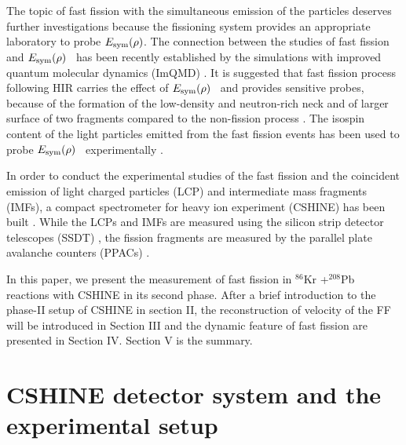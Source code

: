 \documentclass[submitting]{nst}
\def\krpb {$^{86}$Kr +$^{208}$Pb}
\def\esym{$E_{sym}(\rho)$}
\def\esym {$E_{\rm sym}(\rho)$}
\begin{document}
The topic of fast fission with the simultaneous emission of the particles deserves further investigations because the fissioning system provides an appropriate laboratory to probe \esym. The connection between the studies of fast fission and \esym~ has been recently  established  by the simulations with improved quantum molecular dynamics (ImQMD) \cite{Wuqh2019,Wuqh2020}. It is suggested that fast fission process following HIR carries the effect of \esym~ and provides sensitive probes, because of the formation of the low-density and neutron-rich neck and of larger surface of two fragments compared to the non-fission process  \cite{Wuqh2020,Pei2020}.  The isospin content of the light particles emitted from the fast fission events has been used to probe \esym~ experimentally \cite{Zy2017}.  

In order to conduct the experimental studies of the fast fission and the coincident emission of light charged particles (LCP) and intermediate mass fragments (IMFs), a compact spectrometer for heavy ion experiment (CSHINE) has been built \cite{Guanfh2021,Wangyj2021}.  While the LCPs and IMFs are measured using the silicon strip detector telescopes (SSDT) \cite{Guanfh2022,Wangyj2022}, the fission fragments are measured by the parallel plate avalanche counters (PPACs) \cite{Weixl2020}. 

In this paper, we present the measurement of fast fission in \krpb~ reactions with CSHINE in its second phase.   After a brief introduction to the phase-II setup of CSHINE  in section II, the reconstruction of velocity of the FF will be introduced in Section III and the dynamic feature of fast fission are presented in Section IV. Section V is the summary.

\section{CSHINE detector system and the experimental setup}\label{sec.II}
\end{document}

